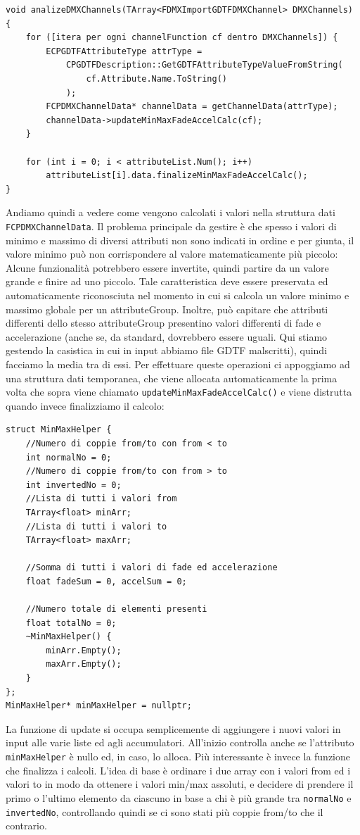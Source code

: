 \documentclass[main.tex]{subfiles}
\begin{document}
\begin{lstlisting}
void analizeDMXChannels(TArray<FDMXImportGDTFDMXChannel> DMXChannels) {
    for ([itera per ogni channelFunction cf dentro DMXChannels]) {
        ECPGDTFAttributeType attrType =
            CPGDTFDescription::GetGDTFAttributeTypeValueFromString(
                cf.Attribute.Name.ToString()
            );
        FCPDMXChannelData* channelData = getChannelData(attrType);
        channelData->updateMinMaxFadeAccelCalc(cf);
    }

    for (int i = 0; i < attributeList.Num(); i++)
        attributeList[i].data.finalizeMinMaxFadeAccelCalc();
}
\end{lstlisting}
Andiamo quindi a vedere come vengono calcolati i valori nella struttura dati \lstinline{FCPDMXChannelData}. Il problema principale da gestire è che spesso i valori di minimo e massimo di diversi attributi non sono indicati in ordine e per giunta, il valore minimo può non corrispondere al valore matematicamente più piccolo: Alcune funzionalità potrebbero essere invertite, quindi partire da un valore grande e finire ad uno piccolo. Tale caratteristica deve essere preservata ed automaticamente riconosciuta nel momento in cui si calcola un valore minimo e massimo globale per un attributeGroup. Inoltre, può capitare che attributi differenti dello stesso attributeGroup presentino valori differenti di fade e accelerazione (anche se, da standard, dovrebbero essere uguali. Qui stiamo gestendo la casistica in cui in input abbiamo file GDTF malscritti), quindi facciamo la media tra di essi. Per effettuare queste operazioni ci appoggiamo ad una struttura dati temporanea, che viene allocata automaticamente la prima volta che sopra viene chiamato \lstinline{updateMinMaxFadeAccelCalc()} e viene distrutta quando invece finalizziamo il calcolo:
\begin{lstlisting}
struct MinMaxHelper {
    //Numero di coppie from/to con from < to
    int normalNo = 0;
    //Numero di coppie from/to con from > to
    int invertedNo = 0;
    //Lista di tutti i valori from
    TArray<float> minArr;
    //Lista di tutti i valori to
    TArray<float> maxArr;

    //Somma di tutti i valori di fade ed accelerazione
    float fadeSum = 0, accelSum = 0;

    //Numero totale di elementi presenti
    float totalNo = 0;
    ~MinMaxHelper() {
        minArr.Empty();
        maxArr.Empty();
    }
};
MinMaxHelper* minMaxHelper = nullptr;
\end{lstlisting}
La funzione di update si occupa semplicemente di aggiungere i nuovi valori in input alle varie liste ed agli accumulatori. All'inizio controlla anche se l'attributo \lstinline{minMaxHelper} è nullo ed, in caso, lo alloca. Più interessante è invece la funzione che finalizza i calcoli. L'idea di base è ordinare i due array con i valori from ed i valori to in modo da ottenere i valori min/max assoluti, e decidere di prendere il primo o l'ultimo elemento da ciascuno in base a chi è più grande tra \lstinline{normalNo} e \lstinline{invertedNo}, controllando quindi se ci sono stati più coppie from/to  che il contrario.
\end{document}
